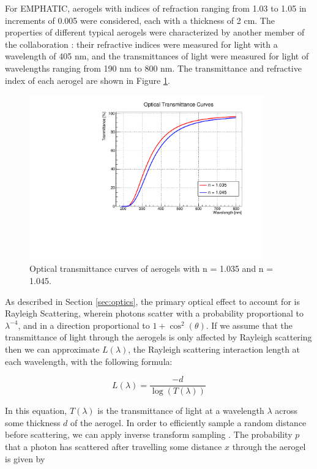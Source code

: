 For EMPHATIC, aerogels with indices of refraction ranging from 1.03 to 1.05 in increments of 0.005 were considered, each with a thickness of 2 cm.
The properties of different typical aerogels were characterized by another member of the collaboration : their refractive indices were measured for light with a wavelength of 405 nm, and the transmittances of light were measured for light of wavelengths ranging from 190 nm to 800 nm.
The transmittance and refractive index of each aerogel are shown in Figure \ref{fig:transmittance}.

\begin{figure}[]
  \centering
  \includegraphics[width=0.9\textwidth]{./figs/transmittance.pdf}
    \caption{Optical transmittance curves of aerogels with n = 1.035 and n = 1.045.}
  \label{fig:transmittance}
\end{figure}

As described in Section \ref{sec:optics}, the primary optical effect to account for is Rayleigh Scattering, wherein photons scatter with a probability proportional to $\lambda^{-4}$, and in a direction proportional to $1 + \cos^2(\theta)$.
If we assume that the transmittance of light through the aerogels is only affected by Rayleigh scattering then we can approximate $L(\lambda)$, the Rayleigh scattering interaction length at each wavelength, with the following formula:

\begin{equation}
L(\lambda) = \frac{-d}{\log(T(\lambda))}
    \label{eq:scatLength}
\end{equation}

In this equation, $T(\lambda)$ is the transmittance of light at a wavelength $\lambda$ across some thickness $d$ of the aerogel.
In order to efficiently sample a random distance before scattering, we can apply inverse transform sampling .
The probability $p$ that a photon has scattered after travelling some distance $x$ through the aerogel is given by

